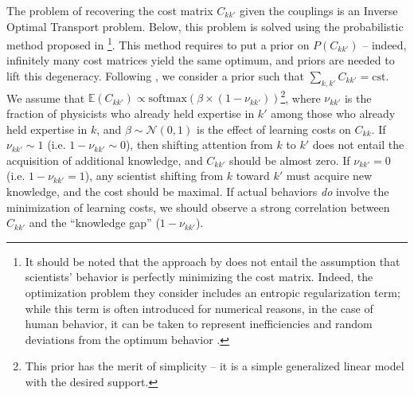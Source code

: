 \documentclass{article}
\begin{document}
The problem of recovering the cost matrix $C_{kk'}$ given the couplings is an Inverse Optimal Transport problem. Below, this problem is solved using the probabilistic method proposed in \citealt{pmlr-v162-chiu22b}\footnote{It should be noted that the approach by \citet{pmlr-v162-chiu22b} does not entail the assumption that scientists' behavior is perfectly minimizing the cost matrix. Indeed, the optimization problem they consider includes an entropic regularization term; while this term is often introduced for numerical reasons, in the case of human behavior, it can be taken to represent inefficiencies and random deviations from the optimum behavior \citep{dupuy2014personality}.}. 
This method requires to put a prior on $P(C_{kk'})$ -- indeed, infinitely many cost matrices yield the same optimum, and priors are needed to lift this degeneracy. Following \citealt{pmlr-v162-chiu22b}, we consider a prior such that $\sum_{k,k'}C_{kk'}=\mathrm{cst}$. We assume that $\mathbb{E}(C_{kk'})\propto \mathrm{softmax}(\beta \times (1-\nu_{kk'}))$\footnote{This prior has the merit of simplicity -- it is a simple generalized linear model with the desired support.}, where $\nu_{kk'}$ is the fraction of physicists who already held expertise in $k'$ among those who already held expertise in $k$, and $\beta\sim\mathcal{N}(0,1)$ is the effect of learning costs on $C_{kk
}$. If $\nu_{kk'}\sim 1$ (i.e. $1-\nu_{kk'}\sim 0$), then shifting attention from $k$ to $k'$ does not entail the acquisition of additional knowledge, and $C_{kk'}$ should be almost zero. If $\nu_{kk'}=0$ (i.e. $1-\nu_{kk'}= 1$), any scientist shifting from $k$ toward $k'$ must acquire new knowledge, and the cost should be maximal. If actual behaviors \textit{do} involve the minimization of learning costs, we should observe a strong correlation between $C_{kk'}$ and the ``knowledge gap'' ($1-\nu_{kk'}$).
\end{document}
